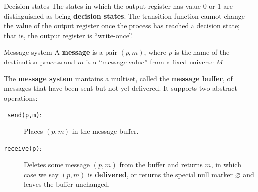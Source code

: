 \documentclass[12pt]{beamer}
\begin{document}
  \begin{frame}{Decision states}
    The states in which the output register has value \(0\) or \(1\) are distinguished as being \textbf{decision states}. The transition function cannot change the value of the output register once the process has reached a decision state; that is, the output register is ``write-once''.

    \vspace{0.25cm}

    \begin{figure}
    \end{figure}
  \end{frame}

  \begin{frame}{Message system}
    A \textbf{message} is a pair \((p,m)\), where \(p\) is the name of the destination process and \(m\) is a ``message value'' from a fixed universe \(M\).

    \vspace{0.25cm}

    \begin{definition}
      The \textbf{message system} mantains a multiset, called the \textbf{message buffer}, of messages that have been sent but not yet delivered. It supports two abstract operations:
      \begin{description}
        \item[\texttt{ send(p,m)}:] Places \((p,m)\) in the message buffer.
	\item[\texttt{receive(p)}:] Deletes some message \((p,m)\) from the buffer and returns \(m\), in which case we say \((p,m)\) is \textbf{delivered}, or returns the special null marker \(\varnothing\) and leaves the buffer unchanged.
      \end{description}
    \end{definition}
  \end{frame}
\end{document}
